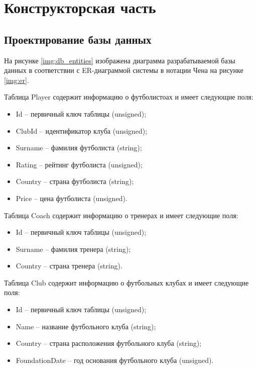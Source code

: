 \chapter{Конструкторская часть}

\section{Проектирование базы данных}

На рисунке \ref{img:db_entities} изображена диаграмма разрабатываемой базы данных в соответствии с ER-диаграммой системы в нотации Чена на рисунке \ref{img:er}.


Таблица Player содержит информацию о футболистоах и имеет следующие поля:

\begin{itemize}
    \item Id -- первичный ключ таблицы (unsigned);
    \item ClubId -- идентификатор клуба (unsigned);
    \item Surname -- фамилия футболиста (string);
    \item Rating -- рейтинг футболиста (unsigned);
    \item Country -- страна футболиста (string);
    \item Price -- цена футболиста (unsigned).
\end{itemize}

\clearpage

Таблица Coach содержит информацию о тренерах и имеет следующие поля:

\begin{itemize}
    \item Id -- первичный ключ таблицы (unsigned);
    \item Surname -- фамилия тренера (string);
    \item Country -- страна тренера (string).
\end{itemize}

Таблица Club содержит информацию о футбольных клубах и имеет следующие поля:

\begin{itemize}
    \item Id -- первичный ключ таблицы (unsigned);
    \item Name -- название футбольного клуба (string);
    \item Country -- страна расположения футбольного клуба (string);
    \item FoundationDate -- год основания футбольного клуба (unsigned).
\end{itemize}


